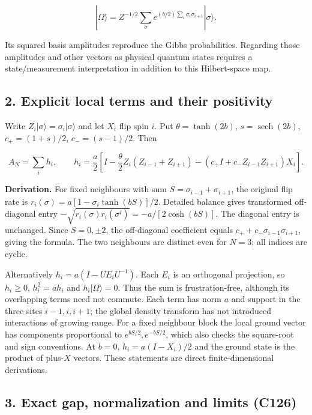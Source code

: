 \documentclass[11pt,a4paper]{article}
\begin{document}
\[
|\Omega\rangle=Z^{-1/2}\sum_\sigma
 e^{(b/2)\sum_i\sigma_i\sigma_{i+1}}|\sigma\rangle.
\]

Its squared basis amplitudes reproduce the Gibbs probabilities.
Regarding those amplitudes and other vectors as physical quantum states
requires a state/measurement interpretation in addition to this
Hilbert-space map.

\hypertarget{explicit-local-terms-and-their-positivity}{%
\subsection{2. Explicit local terms and their
positivity}\label{explicit-local-terms-and-their-positivity}}

Write \(Z_i|\sigma\rangle=\sigma_i|\sigma\rangle\) and let \(X_i\) flip
spin \(i\). Put \(\theta=\tanh(2b)\), \(s=\operatorname{sech}(2b)\),
\(c_+=(1+s)/2\), \(c_-=(s-1)/2\). Then

\[
A_N=\sum_i h_i,\qquad
h_i=\frac a2\left[I-\frac\theta2Z_i(Z_{i-1}+Z_{i+1})
 -(c_+I+c_-Z_{i-1}Z_{i+1})X_i\right].
\]

\textbf{Derivation.} For fixed neighbours with sum
\(S=\sigma_{i-1}+\sigma_{i+1}\), the original flip rate is
\(r_i(\sigma)=a[1-\sigma_i\tanh(bS)]/2\). Detailed balance gives
transformed off-diagonal entry
\(-\sqrt{r_i(\sigma)r_i(\sigma^i)}=-a/[2\cosh(bS)]\). The diagonal entry
is unchanged. Since \(S=0,\pm2\), the off-diagonal coefficient equals
\(c_++c_-\sigma_{i-1}\sigma_{i+1}\), giving the formula. The two
neighbours are distinct even for \(N=3\); all indices are cyclic.

Alternatively \(h_i=a(I-UE_iU^{-1})\). Each \(E_i\) is an orthogonal
projection, so \(h_i\ge0\), \(h_i^2=ah_i\) and \(h_i|\Omega\rangle=0\).
Thus the sum is frustration-free, although its overlapping terms need
not commute. Each term has norm \(a\) and support in the three sites
\(i-1,i,i+1\); the global density transform has not introduced
interactions of growing range. For a fixed neighbour block the local
ground vector has components proportional to \(e^{bS/2},e^{-bS/2}\),
which also checks the square-root and sign conventions. At \(b=0\),
\(h_i=a(I-X_i)/2\) and the ground state is the product of plus-\(X\)
vectors. These statements are direct finite-dimensional derivations.

\hypertarget{exact-gap-normalization-and-limits-c126}{%
\subsection{3. Exact gap, normalization and limits
(C126)}\label{exact-gap-normalization-and-limits-c126}}
\end{document}
